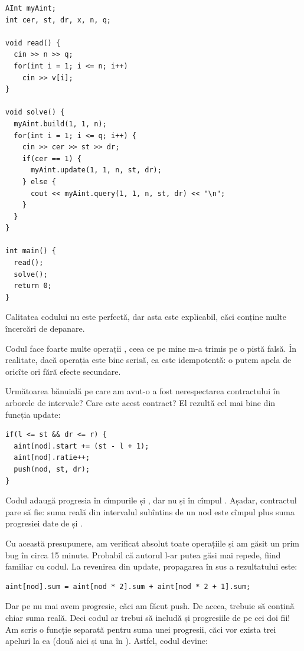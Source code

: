 \documentclass[../main.tex]{subfiles}
\begin{document}
\begin{verbatim}
AInt myAint;
int cer, st, dr, x, n, q;

void read() {
  cin >> n >> q;
  for(int i = 1; i <= n; i++)
    cin >> v[i];
}

void solve() {
  myAint.build(1, 1, n);
  for(int i = 1; i <= q; i++) {
    cin >> cer >> st >> dr;
    if(cer == 1) {
      myAint.update(1, 1, n, st, dr);
    } else {
      cout << myAint.query(1, 1, n, st, dr) << "\n";
    }
  }
}

int main() {
  read();
  solve();
  return 0;
}
\end{verbatim}

Calitatea codului nu este perfectă, dar asta este explicabil, căci conține multe încercări de depanare.

Codul face foarte multe operații , ceea ce pe mine m-a trimis pe o pistă falsă. În realitate, dacă operația  este bine scrisă, ea este idempotentă: o putem apela de oricîte ori fără efecte secundare.

Următoarea bănuială pe care am avut-o a fost nerespectarea contractului în arborele de intervale? Care este acest contract? El rezultă cel mai bine din funcția update:

\begin{verbatim}
if(l <= st && dr <= r) {
  aint[nod].start += (st - l + 1);
  aint[nod].ratie++;
  push(nod, st, dr);
}
\end{verbatim}

Codul adaugă progresia în cîmpurile  și , dar nu și în cîmpul . Așadar, contractul pare să fie: suma reală din intervalul subîntins de un nod este cîmpul  plus suma progresiei date de  și .

Cu această presupunere, am verificat absolut toate operațiile și am găsit un prim bug în circa 15 minute. Probabil că autorul l-ar putea găsi mai repede, fiind familiar cu codul. La revenirea din update, propagarea în sus a rezultatului este:

\begin{verbatim}
aint[nod].sum = aint[nod * 2].sum + aint[nod * 2 + 1].sum;
\end{verbatim}

Dar pe  nu mai avem progresie, căci am făcut push. De aceea,  trebuie să conțină chiar suma reală. Deci codul ar trebui să includă și progresiile de pe cei doi fii! Am scris o funcție separată pentru suma unei progresii, căci vor exista trei apeluri la ea (două aici și una în ). Astfel, codul devine:
\end{document}

